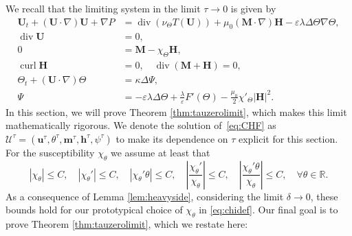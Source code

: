\documentclass[10pt,letterpaper,twoside]{amsart}
\theoremstyle{definition}{\newtheorem{definition}[lemma]{Definition}}
\theoremstyle{note}{\newtheorem{claim}{Claim}[section]
\newtheorem*{claim*}{Claim}}
\numberwithin{equation}{section}
\newcommand{\eps}{\varepsilon}
\newcommand{\R}{\mathbb{R}}
\newcommand{\Grad}{\nabla}
\newcommand{\Div}{\operatorname{div}}
\newcommand{\Curl}{\operatorname{curl}}
\newcommand{\Bu}{\mathbf{U}}
\newcommand{\Bm}{\mathbf{M}}
\newcommand{\Bh}{\mathbf{H}}
\newcommand{\bmt}{\mathbf{m}^{\tau}}
\newcommand{\bht}{\mathbf{h}^{\tau}}
\newcommand{\but}{\mathbf{u}^{\tau}}
\newcommand{\tht}{\theta^{\tau}}
\newcommand{\psit}{\psi^{\tau}}
\begin{document}
We recall that the limiting system in the limit $\tau \to 0$ is given by
\begin{subequations}\label{eq:CHFtau1}
	\begin{align}
		\Bu_t+(\Bu\cdot\Grad)\Bu+\Grad P&=\Div(\nu_\Theta T(\Bu))+\mu_0(\Bm\cdot\Grad)\Bh-\eps\lambda\Delta\Theta\Grad\Theta,\label{eq:nse1T}\\
		\Div\Bu&=0,\\
		0&=\Bm-\chi_\Theta\Bh,\label{eq:eqmT}\\
		\Curl\Bh &=0,\quad \Div(\Bm+\Bh)=0,\label{eq:maxwellT}\\
		\Theta_t+(\Bu\cdot\Grad)\Theta&=\kappa\Delta\Psi,\label{eq:phasefield1T}\\
		\Psi&= -\eps\lambda\Delta\Theta+\frac{\lambda}{\eps}F'(\Theta)-\frac{\mu_0}{2 }\chi'_\Theta|\Bh|^2.\label{eq:psiT}
	\end{align}
\end{subequations}
In this section, we will prove Theorem \ref{thm:tauzerolimit}, which makes this limit mathematically rigorous. We denote the solution of~\eqref{eq:CHF} as $\mathcal{U}^\tau=(\but,\tht,\bmt,\bht,\psit)$ to make its dependence on $\tau$ explicit for this section. For the susceptibility $\chi_\theta$ we assume at least that
\begin{equation}
	\label{eq:assonchi}
|\chi_\theta|\leq C,\quad 	|\chi_\theta'|\leq C,\quad |\chi_\theta' \theta|\leq C,\quad \left| \frac{\chi_\theta'}{\chi_{\theta}}\right|\leq C, \quad \left| \frac{\chi_\theta' \theta}{\chi_{\theta}}\right|\leq C,\quad \forall \theta\in \R.
	\end{equation}
As a consequence of Lemma \ref{lem:heavyside}, considering the limit $\delta \to 0$, these bounds hold for our prototypical choice of $\chi_\theta$ in \eqref{eq:chidef}. Our final goal is to prove Theorem \ref{thm:tauzerolimit}, which we restate here:
\tauzerolimit*
\end{document}

